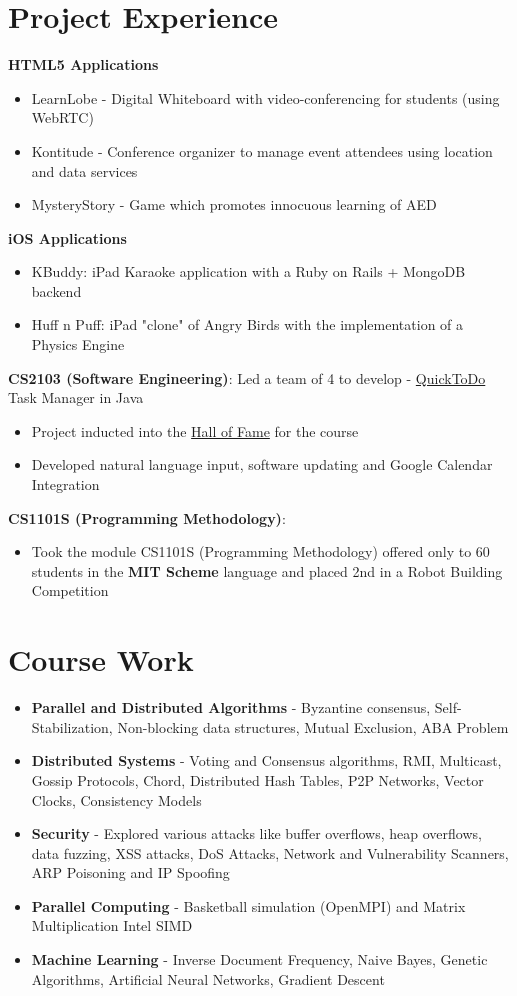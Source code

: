 \documentclass[11pt,a4paper]{moderncv}
\begin{document}
\section{Project Experience}
\textbf{HTML5 Applications}
\begin{itemize}
    \item LearnLobe - Digital Whiteboard with video-conferencing for students (using WebRTC)
    \item Kontitude - Conference organizer to manage event attendees using location and data services
    \item MysteryStory - Game which promotes innocuous learning of AED
\end{itemize}
\textbf{iOS Applications}
\begin{itemize}
     \item KBuddy: iPad Karaoke application with a Ruby on Rails + MongoDB backend
     \item Huff n Puff: iPad "clone" of Angry Birds with the implementation of a Physics Engine
\end{itemize}
\textbf{CS2103 (Software Engineering)}: Led a team of 4 to develop - \href{http://github.com/vellvisher/quicktodo}{QuickToDo} Task Manager in Java
 \begin{itemize}
     \item Project inducted into the \href{http://www.comp.nus.edu.sg/~cs2103/AY1112S1projects/halloffame.html}{Hall of Fame}
         for the course
     \item Developed natural language input, software updating and Google Calendar Integration
 \end{itemize}
 \textbf{CS1101S (Programming Methodology)}:
 \begin{itemize}
    \item Took the module CS1101S (Programming Methodology) offered only
        to 60 students in the \textbf{MIT Scheme} language and placed 2nd in a Robot Building Competition
 \end{itemize}
\section{Course Work}
{\begin{itemize}
 \item \textbf{Parallel and Distributed Algorithms} - Byzantine consensus, Self-Stabilization, Non-blocking data structures,
    Mutual Exclusion, ABA Problem
 \item \textbf{Distributed Systems} - Voting and Consensus algorithms, RMI, Multicast, Gossip Protocols, Chord, Distributed Hash Tables, P2P Networks, Vector Clocks, Consistency Models
 \item \textbf{Security} - Explored various attacks like buffer overflows,
     heap overflows, data fuzzing, XSS attacks, DoS Attacks, Network and Vulnerability Scanners,
     ARP Poisoning and IP Spoofing
 \item \textbf{Parallel Computing} - Basketball simulation (OpenMPI) and Matrix Multiplication Intel SIMD
 \item \textbf{Machine Learning} - Inverse Document Frequency, Naive Bayes, Genetic Algorithms, Artificial Neural Networks, Gradient Descent
 \end{itemize}}
\end{document}
